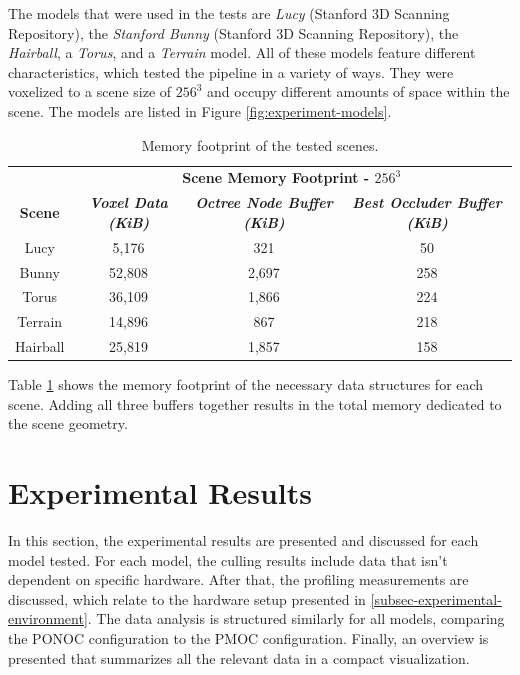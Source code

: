 \noindent
The models that were used in the tests are \emph{Lucy} (Stanford 3D Scanning Repository), the 
\emph{Stanford Bunny} (Stanford 3D Scanning Repository), the \emph{Hairball}, a \emph{Torus}, 
and a \emph{Terrain} model. All of these models feature different characteristics, which tested 
the pipeline in a variety of ways. They were voxelized to a scene size of $256^3$ and occupy 
different amounts of space within the scene. The models are listed in Figure 
\ref{fig:experiment-models}. \\

\begin{table}[htbp]
  \begin{center}
    \begin{tabular}{|c|c|c|c|}
      \hline
      \textbf{}&\multicolumn{3}{|c|}{\textbf{Scene Memory Footprint - $256^3$}} \\
      \cline{2-4} 
      \textbf{Scene} & \textbf{\textit{Voxel Data (KiB)}}& \textbf{\textit{Octree Node Buffer (KiB)}} & \textbf{\textit{Best Occluder Buffer (KiB)}} \\
      \hline
      Lucy        & 5,176   & 321   & 50  \\
      Bunny       & 52,808  & 2,697 & 258 \\
      Torus       & 36,109  & 1,866 & 224 \\
      Terrain     & 14,896  & 867   & 218 \\
      Hairball    & 25,819  & 1,857 & 158 \\
      \hline
    \end{tabular}
  \end{center}
  \caption{Memory footprint of the tested scenes.}
  \label{tbl:scene-data-size}
\end{table}

\noindent
Table \ref{tbl:scene-data-size} shows the memory footprint of the necessary data structures for each scene. 
Adding all three buffers together results in the total memory dedicated to the scene geometry.

\section{Experimental Results}

In this section, the experimental results are presented and discussed for each model tested.
For each model, the culling results include data that isn't dependent on specific hardware. 
After that, the profiling measurements are discussed, which relate to the hardware setup presented 
in \ref{subsec-experimental-environment}. The data analysis is structured similarly for all models,
comparing the \ac{PONOC} configuration to the \ac{PMOC} configuration. Finally, an overview 
is presented that summarizes all the relevant data in a compact visualization.

